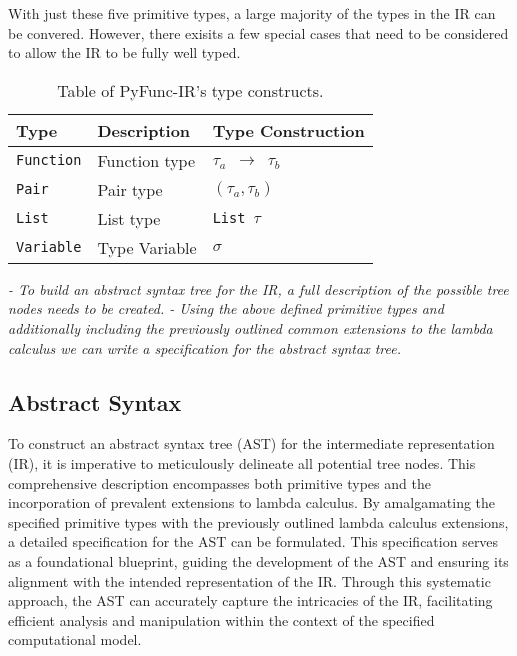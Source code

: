 \documentclass{l4proj}
\begin{document}
With just these five primitive types, a large majority of the types in the IR can be convered.
However, there exisits a few special cases that need to be considered to allow the IR to be fully well typed.

\begin{table}[h]
\caption{Table of PyFunc-IR's type constructs.}
\begin{center}
\begin{tabular}{@{}|l|l|l|@{}}
    \hline
    \textbf{Type}        & \textbf{Description}      & \textbf{Type Construction}  \\
    \hline
    \texttt{Function}    & Function type             & \texttt{$\tau_a$ $\rightarrow$ $\tau_b$} \\
    \texttt{Pair}        & Pair type                 & \texttt{$(\tau_a, \tau_b)$} \\
    \texttt{List}        & List type                 & \texttt{List $\tau$} \\
    \texttt{Variable}    & Type Variable             & \texttt{$\sigma$} \\
    \hline
\end{tabular}
\end{center}
\end{table}

\emph{- To build an abstract syntax tree for the IR, a full description of the possible tree nodes needs to be created.
- Using the above defined primitive types and additionally including the previously outlined common extensions to the lambda calculus we can write a specification for the abstract syntax tree.}

\subsection*{Abstract Syntax}

To construct an abstract syntax tree (AST) for the intermediate representation (IR), it is imperative to meticulously delineate all potential tree nodes.
This comprehensive description encompasses both primitive types and the incorporation of prevalent extensions to lambda calculus.
By amalgamating the specified primitive types with the previously outlined lambda calculus extensions, a detailed specification for the AST can be formulated.
This specification serves as a foundational blueprint, guiding the development of the AST and ensuring its alignment with the intended representation of the IR.
Through this systematic approach, the AST can accurately capture the intricacies of the IR, facilitating efficient analysis and manipulation within the context of the specified computational model.
\end{document}
